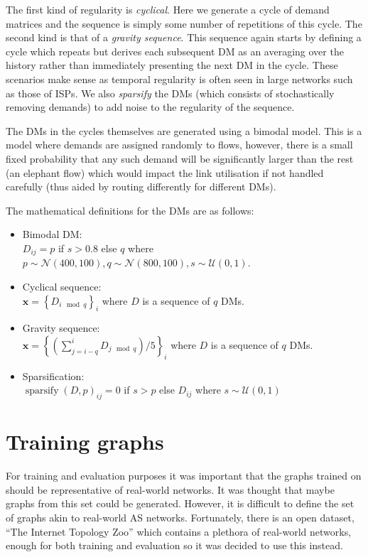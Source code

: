 The first kind of regularity is \emph{cyclical}. Here we generate a cycle of demand matrices and the sequence is simply some number of repetitions of this cycle. The second kind is that of a \emph{gravity sequence}\cite{roughan2002experience}. This sequence again starts by defining a cycle which repeats but derives each subsequent DM as an averaging over the history rather than immediately presenting the next DM in the cycle. These scenarios make sense as temporal regularity is often seen in large networks such as those of ISPs\cite{fortz2002optimizing}. We also \emph{sparsify} the DMs (which consists of stochastically removing demands) to add noise to the regularity of the sequence.

The DMs in the cycles themselves are generated using a bimodal model\cite{medina2002traffic}. This is a model where demands are assigned randomly to flows, however, there is a small fixed probability that any such demand will be significantly larger than the rest (an elephant flow) which would impact the link utilisation if not handled carefully (thus aided by routing differently for different DMs).


The mathematical definitions for the DMs are as follows:
\begin{itemize}
  \item Bimodal DM:\\
    $D_{ij} = p$ if $s > 0.8$ else $q$ where $p \sim \mathcal{N}(400, 100), q \sim \mathcal{N}(800, 100), s \sim \mathcal{U}(0,1)$.
  \item Cyclical sequence:\\
    $\bm{x} = \left\{ D_{i \mod q} \right\}_{i}$ where $D$ is a sequence of $q$ DMs.
  \item Gravity sequence:\\
    $\bm{x} = \left\{\left(\sum_{j=i-q}^{i}{D_{j \mod q}}\right) / 5 \right\}_{i}$ where $D$ is a sequence of $q$ DMs.
  \item Sparsification:\\
    $\operatorname{sparsify}(D, p)_{ij} = 0$ if $s > p$ else $D_{ij}$ where $s \sim \mathcal{U}(0,1)$
\end{itemize}

\section{Training graphs}
For training and evaluation purposes it was important that the graphs trained on should be representative of real-world networks. It was thought that maybe graphs from this set could be generated. However, it is difficult to define the set of graphs akin to real-world AS networks. Fortunately, there is an open dataset, ``The Internet Topology Zoo''\cite{6027859} which contains a plethora of real-world networks, enough for both training and evaluation so it was decided to use this instead.
